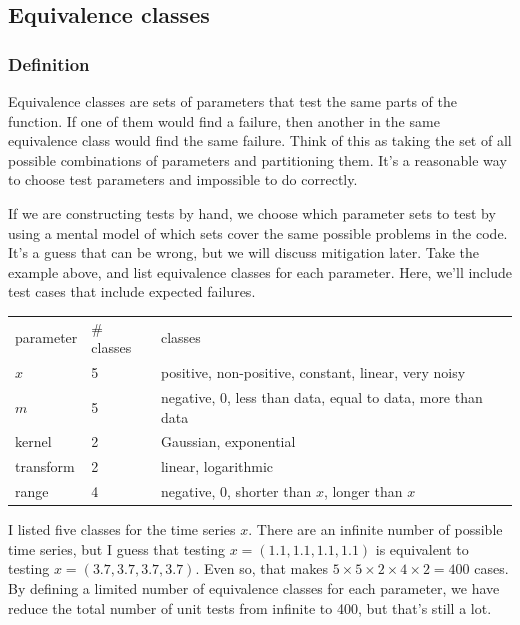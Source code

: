 \documentclass[fleqn,10pt]{olplainarticle}
\begin{document}
\subsection{Equivalence classes}\label{sec:limits}

\subsubsection{Definition}
%
% 

Equivalence classes are sets of parameters that test the same
parts of the function. If one of them would find a failure,
then another in the same equivalence class would find the same
failure. Think of this as taking the set of all possible
combinations of parameters and partitioning them. It's a reasonable
way to choose test parameters and impossible to do correctly.

If we are constructing tests by hand, we choose which parameter
sets to test by using a mental model of which sets cover the same
possible problems in the code. It's a guess that can be wrong,
but we will discuss mitigation later.
Take the example above, and list equivalence classes for each parameter.
Here, we'll include test cases that include expected failures.
\begin{center}
\begin{tabular}{|l|l|l|}\hline
parameter & \# classes & classes \\
$x$ & 5 & positive, non-positive, constant, linear, very noisy \\
$m$ & 5 & negative, 0, less than data, equal to data, more than data \\
kernel & 2 & Gaussian, exponential \\
transform & 2 & linear, logarithmic \\
range & 4 & negative, 0, shorter than $x$, longer than $x$ \\ \hline
\end{tabular}
\end{center}
I listed five classes for the time series $x$. There are an infinite
number of possible time series, but I guess that testing
$x=(1.1, 1.1, 1.1, 1.1)$ is equivalent to testing
$x=(3.7, 3.7, 3.7, 3.7)$.
Even so, that makes $5\times 5 \times 2 \times 4\times 2 = 400$ cases.
By defining a limited number of equivalence classes for
each parameter, we have reduce the total number of unit tests
from infinite to 400, but that's still a lot.
\end{document}
